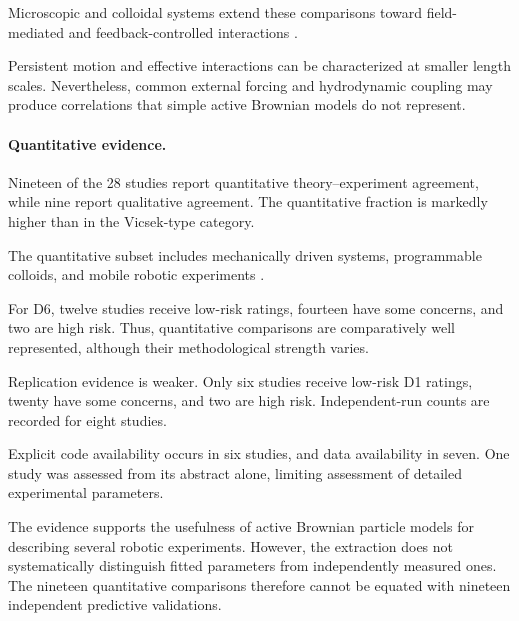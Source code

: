 Microscopic and colloidal systems
extend these comparisons toward
field-mediated and feedback-controlled
interactions
\cite{Rivas2023spatialpatterningo,Raghavendra2026programmablepersist,Desgranges2023microswimmersunder,Knippenberg2022roleofcohesionin,Guo2026afeedbackcontrolle}.

Persistent motion and effective
interactions can be characterized
at smaller length scales.
Nevertheless, common external
forcing and hydrodynamic coupling
may produce correlations that
simple active Brownian models
do not represent.

\paragraph*{Quantitative evidence.}

Nineteen of the 28 studies report
quantitative theory--experiment
agreement, while nine report
qualitative agreement. The
quantitative fraction is markedly
higher than in the Vicsek-type
category.

The quantitative subset includes
mechanically driven systems,
programmable colloids, and
mobile robotic experiments
\cite{Balda2022playingwithactive,Musacchio2026activeembracemente,Arbel2025amechanicalroutef,Knippenberg2022roleofcohesionin,Raghavendra2026programmablepersist,Desgranges2023microswimmersunder,Guo2026afeedbackcontrolle,Paramanick2025spontaneousemergenc,Musacchio2026fluidizationinduced,Barone2024experimentalandnum,Mijalkov2016engineeringsensoria,Hao2022controllingcollisio,Callegari2023playingwithactive,Balda2024playingwithactive,Li2021programmingactivec,Siebers2023exploitingcompositi,Zion2023morphologicalcomput,Wagner2026geometryinducedtra,Zion2021distributedonline}.

For D6, twelve studies receive
low-risk ratings, fourteen have
some concerns, and two are high
risk. Thus, quantitative comparisons
are comparatively well represented,
although their methodological
strength varies.

Replication evidence is weaker.
Only six studies receive low-risk
D1 ratings, twenty have some
concerns, and two are high risk.
Independent-run counts are
recorded for eight studies.

Explicit code availability
occurs in six studies,
and data availability in seven.
One study was assessed from
its abstract alone, limiting
assessment of detailed
experimental parameters.

The evidence supports the usefulness
of active Brownian particle models
for describing several robotic
experiments. However, the extraction
does not systematically distinguish
fitted parameters from independently
measured ones. The nineteen
quantitative comparisons therefore
cannot be equated with nineteen
independent predictive validations.

